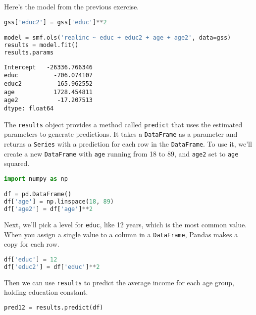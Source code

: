 \pagebreak

Here's the model from the previous exercise.

\begin{lstlisting}[language=Python,style=source]
gss['educ2'] = gss['educ']**2

model = smf.ols('realinc ~ educ + educ2 + age + age2', data=gss)
results = model.fit()
results.params
\end{lstlisting}

\begin{lstlisting}[style=output]
Intercept   -26336.766346
educ          -706.074107
educ2          165.962552
age           1728.454811
age2           -17.207513
dtype: float64
\end{lstlisting}

The \passthrough{\lstinline!results!} object provides a method called
\passthrough{\lstinline!predict!} that uses the estimated parameters to
generate predictions. It takes a \passthrough{\lstinline!DataFrame!} as
a parameter and returns a \passthrough{\lstinline!Series!} with a
prediction for each row in the \passthrough{\lstinline!DataFrame!}. To
use it, we'll create a new \passthrough{\lstinline!DataFrame!} with
\passthrough{\lstinline!age!} running from 18 to 89, and
\passthrough{\lstinline!age2!} set to \passthrough{\lstinline!age!}
squared.

\begin{lstlisting}[language=Python,style=source]
import numpy as np

df = pd.DataFrame()
df['age'] = np.linspace(18, 89)
df['age2'] = df['age']**2
\end{lstlisting}

Next, we'll pick a level for \passthrough{\lstinline!educ!}, like 12
years, which is the most common value. When you assign a single value to
a column in a \passthrough{\lstinline!DataFrame!}, Pandas makes a copy
for each row.

\begin{lstlisting}[language=Python,style=source]
df['educ'] = 12
df['educ2'] = df['educ']**2
\end{lstlisting}

Then we can use \passthrough{\lstinline!results!} to predict the average
income for each age group, holding education constant.

\begin{lstlisting}[language=Python,style=source]
pred12 = results.predict(df)
\end{lstlisting}


